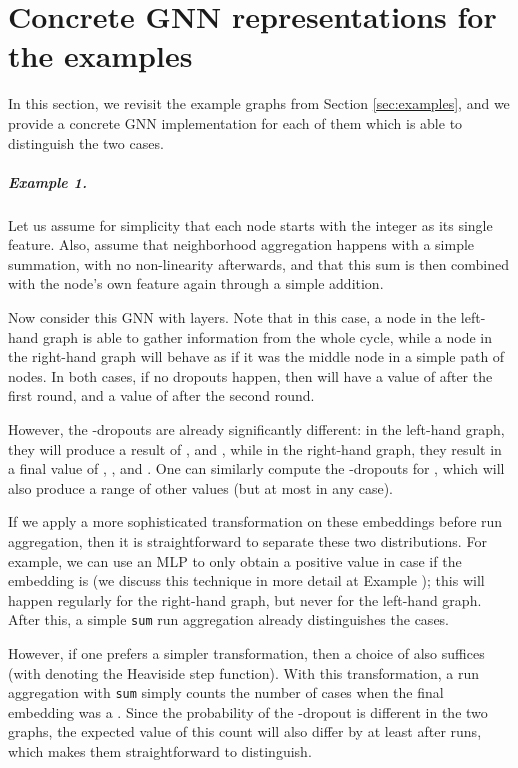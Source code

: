 \documentclass{article}
\begin{document}




\newpage
\appendix

\section{Concrete GNN representations for the examples} \label{app:examples}

In this section, we revisit the example graphs from Section \ref{sec:examples}, and we provide a concrete GNN implementation for each of them which is able to distinguish the two cases.

\subparagraph*{Example 1.} Let us assume for simplicity that each node starts with the integer  as its single feature. Also, assume that neighborhood aggregation happens with a simple summation, with no non-linearity afterwards, and that this sum is then combined with the node's own feature again through a simple addition.

Now consider this GNN with  layers. Note that in this case, a node  in the left-hand graph is able to gather information from the whole cycle, while a node  in the right-hand graph will behave as if it was the middle node in a simple path of  nodes. In both cases, if no dropouts happen, then  will have a value of  after the first round, and a value of  after the second round.

However, the -dropouts are already significantly different: in the left-hand graph, they will produce a result of ,  and , while in the right-hand graph, they result in a final value of , ,  and . One can similarly compute the -dropouts for , which will also produce a range of other values (but at most  in any case).

If we apply a more sophisticated transformation on these embeddings before run aggregation, then it is straightforward to separate these two distributions. For example, we can use an MLP to only obtain a positive value in case if the embedding is  (we discuss this technique in more detail at Example ); this will happen regularly for the right-hand graph, but never for the left-hand graph. After this, a simple \texttt{sum} run aggregation already distinguishes the cases.

However, if one prefers a simpler transformation, then a choice of  also suffices (with  denoting the Heaviside step function). With this transformation, a run aggregation with \texttt{sum} simply counts the number of cases when the final embedding was a . Since the probability of the -dropout is different in the two graphs, the expected value of this count will also differ by at least  after  runs, which makes them straightforward to distinguish.
\end{document}
